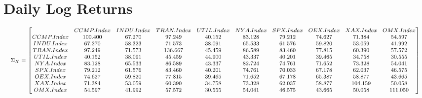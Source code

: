 \documentclass{article}
\begin{document}
\section*{Daily Log Returns}
\begin{equation*}
\begin{medsize}
\Sigma_X=\begin{bmatrix}{}
  & CCMP.Index & INDU.Index & TRAN.Index & UTIL.Index & NYA.Index & SPX.Index & OEX.Index & XAX.Index & OMX.Index \\ 
 CCMP.Index & 100.400 & 67.270 & 97.249 & 40.152 & 83.128 & 79.212 & 74.627 & 71.384 & 54.597 \\ 
  INDU.Index & 67.270 & 58.323 & 71.573 & 38.091 & 65.533 & 61.576 & 59.820 & 53.059 & 41.992 \\ 
  TRAN.Index & 97.249 & 71.573 & 136.667 & 45.459 & 86.589 & 83.460 & 77.815 & 60.390 & 57.572 \\ 
  UTIL.Index & 40.152 & 38.091 & 45.459 & 44.900 & 43.337 & 40.201 & 39.465 & 34.758 & 30.555 \\ 
  NYA.Index & 83.128 & 65.533 & 86.589 & 43.337 & 82.724 & 74.761 & 71.652 & 73.328 & 54.041 \\ 
  SPX.Index & 79.212 & 61.576 & 83.460 & 40.201 & 74.761 & 70.033 & 67.178 & 62.037 & 46.575 \\ 
  OEX.Index & 74.627 & 59.820 & 77.815 & 39.465 & 71.652 & 67.178 & 65.387 & 58.877 & 43.665 \\ 
  XAX.Index & 71.384 & 53.059 & 60.390 & 34.758 & 73.328 & 62.037 & 58.877 & 104.159 & 50.058 \\ 
  OMX.Index & 54.597 & 41.992 & 57.572 & 30.555 & 54.041 & 46.575 & 43.665 & 50.058 & 111.050 \\ 
  \end{bmatrix}
\end{medsize}
\end{equation*}
\end{document}
